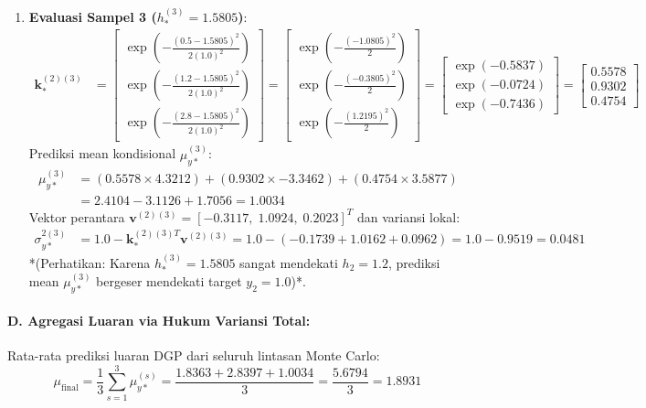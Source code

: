 \documentclass[11pt,a4paper]{article}
\begin{document}
\begin{enumerate}
    \item \textbf{Evaluasi Sampel 3 ($h_*^{(3)} = 1.5805$)}:
    \begin{align}
    \mathbf{k}_*^{(2)(3)} &= \begin{bmatrix} \exp\left(-\frac{(0.5 - 1.5805)^2}{2(1.0)^2}\right) \\ \exp\left(-\frac{(1.2 - 1.5805)^2}{2(1.0)^2}\right) \\ \exp\left(-\frac{(2.8 - 1.5805)^2}{2(1.0)^2}\right) \end{bmatrix} = \begin{bmatrix} \exp\left(-\frac{(-1.0805)^2}{2}\right) \\ \exp\left(-\frac{(-0.3805)^2}{2}\right) \\ \exp\left(-\frac{(1.2195)^2}{2}\right) \end{bmatrix} = \begin{bmatrix} \exp(-0.5837) \\ \exp(-0.0724) \\ \exp(-0.7436) \end{bmatrix} = \begin{bmatrix} \mathbf{0.5578} \\ \mathbf{0.9302} \\ \mathbf{0.4754} \end{bmatrix}
    \end{align}
    Prediksi mean kondisional $\mu_{y*}^{(3)}$:
    \begin{align}
    \mu_{y*}^{(3)} &= (0.5578 \times 4.3212) + (0.9302 \times -3.3462) + (0.4754 \times 3.5877) \nonumber \\
    &= 2.4104 - 3.1126 + 1.7056 = \mathbf{1.0034}
    \end{align}
    Vektor perantara $\mathbf{v}^{(2)(3)} = [-0.3117, \; 1.0924, \; 0.2023]^T$ dan variansi lokal:
    \begin{align}
    \sigma_{y*}^{2(3)} &= 1.0 - \mathbf{k}_*^{(2)(3)T} \mathbf{v}^{(2)(3)} = 1.0 - (-0.1739 + 1.0162 + 0.0962) = 1.0 - 0.9519 = \mathbf{0.0481}
    \end{align}
    *(Perhatikan: Karena $h_*^{(3)} = 1.5805$ sangat mendekati $h_2 = 1.2$, prediksi mean $\mu_{y*}^{(3)}$ bergeser mendekati target $y_2 = 1.0$)*.
\end{enumerate}

\paragraph{D. Agregasi Luaran via Hukum Variansi Total:}
Rata-rata prediksi luaran DGP dari seluruh lintasan Monte Carlo:
\begin{equation}
\mu_{\mathrm{final}} = \frac{1}{3}\sum_{s=1}^3 \mu_{y*}^{(s)} = \frac{1.8363 + 2.8397 + 1.0034}{3} = \frac{5.6794}{3} = \mathbf{1.8931}
\end{equation}
\end{document}
